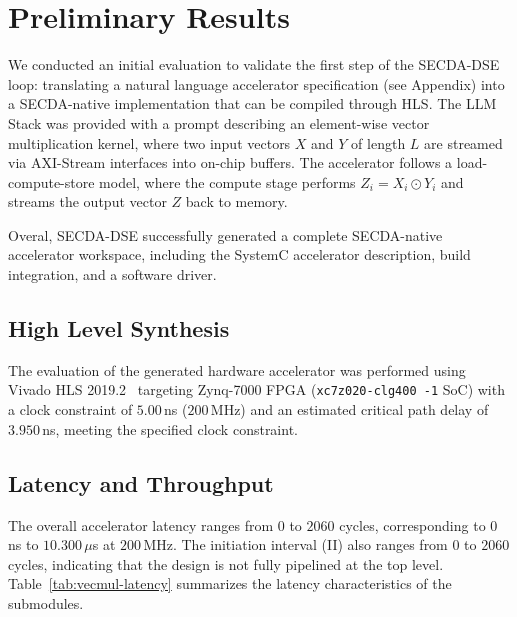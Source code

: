 
\section{Preliminary Results}
\label{Early-Results}

We conducted an initial evaluation to validate the first step of the SECDA-DSE loop: translating a natural language accelerator specification (see Appendix) into a SECDA-native implementation that can be compiled through HLS. 
The LLM Stack was provided with a prompt describing an element-wise vector multiplication kernel, where two input vectors $X$ and $Y$ of length $L$ are streamed via AXI-Stream interfaces into on-chip buffers. The accelerator follows a load-compute-store model, where the compute stage performs $Z_i = X_i \odot Y_i$ and streams the output vector $Z$ back to memory. 

Overal, SECDA-DSE successfully generated a complete SECDA-native accelerator workspace, including the SystemC accelerator description, build integration, and a software driver.



\subsection{High Level Synthesis}

The evaluation of the generated hardware accelerator was performed using Vivado HLS 2019.2~\cite{vivadohls2019_2} targeting Zynq-7000 FPGA (\texttt{xc7z020-clg400 -1} SoC) with a clock constraint of $5.00$\,ns ($200$\,MHz) and an estimated critical path delay of $3.950$\,ns, meeting the specified clock constraint.



\subsection{Latency and Throughput}

The overall accelerator latency ranges from $0$ to $2060$ cycles, corresponding to $0$\,ns to $10.300\,\mu$s at $200$\,MHz. The initiation interval (II) also ranges from $0$ to $2060$ cycles, indicating that the design is not fully pipelined at the top level. 
Table~\ref{tab:vecmul-latency} summarizes the latency characteristics of the submodules.


